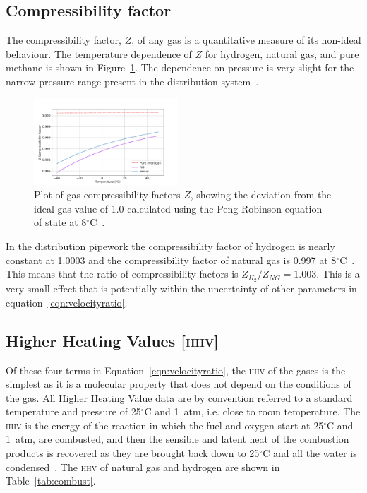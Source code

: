 \documentclass[5p]{elsarticle} %
\begin{document}
\subsection{Compressibility factor}
\label{sec:compressibility}

The compressibility factor, $Z$, of any gas is a quantitative measure of its non-ideal behaviour. 
The temperature dependence of $Z$ for hydrogen, natural gas, and pure methane is shown in Figure~\ref{fig:peng_z}.
The dependence on pressure is very slight for the narrow pressure range present in the distribution system~\citep{GS(M)2023, dodds2013}.

\begin{figure}[htbp]
\centering
\includegraphics[width=0.48\textwidth]{peng_z.png}
\caption{Plot of gas compressibility factors $Z$, showing the deviation from the ideal gas value of 1.0 calculated using the Peng-Robinson equation of state at 8$^\circ$C~\citep{Sargents_github}.}
\label{fig:peng_z}
\end{figure}

In the distribution pipework the compressibility factor of hydrogen is nearly constant at 1.0003 and the compressibility factor of natural gas is 0.997 at 8$^\circ$C~\citep{Sargents_github}.  
This means that the ratio of compressibility factors is $Z_{H_2} / Z_{NG} = 1.003$.
This is a very small effect that is potentially within the uncertainty of other parameters in equation~\eqref{eqn:velocityratio}.

\subsection{Higher Heating Values \textsc{[\textsc{hhv}]}}
\label{sec:hhv}

Of these four terms in Equation~\ref{eqn:velocityratio}, the \textsc{hhv} of the gases is the simplest as it is a molecular property that does not depend on the conditions of the gas.
All Higher Heating Value data are by convention referred to a standard temperature and pressure of 25$^\circ$C and 1~atm, i.e. close to room temperature.
The \textsc{hhv} is the energy of the reaction in which the fuel and oxygen start at 25$^\circ$C and 1~atm, are combusted, and then the sensible and latent heat of the combustion products is recovered as they are brought back down to 25$^\circ$C and all the water is condensed~\citep{nist_delta_H}. 
The \textsc{hhv} of natural gas and hydrogen are shown in Table~\ref{tab:combust}.
\end{document}
